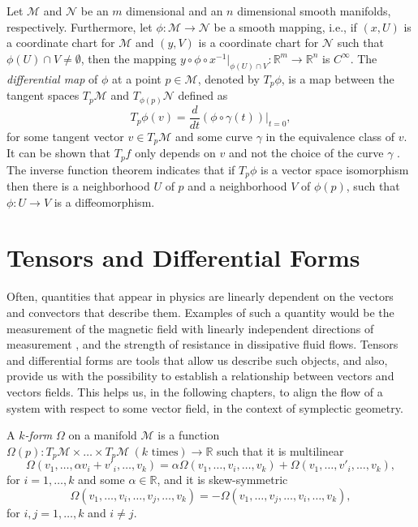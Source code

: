 Let $\mathcal M$ and $\mathcal N$ be an $m$ dimensional and an $n$ dimensional smooth manifolds, respectively. Furthermore, let $\phi:\mathcal M\to \mathcal N$ be a smooth mapping, i.e., if $(x,U)$ is a coordinate chart for $\mathcal M$ and $(y,V)$ is a coordinate chart for $\mathcal N$ such that $\phi(U)\cap V\neq \emptyset$, then the mapping $y\circ \phi \circ x^{-1}|_{\phi(U)\cap V}:\mathbb R^{m}\to \mathbb R^{n}$ is $C^{\infty}$. The \emph{differential map} of $\phi$ at a point $p\in \mathcal M$, denoted by $T_{p}\phi$, is a map between the tangent spaces $T_p \mathcal M$ and $T_{\phi(p)} \mathcal N$ defined as
\begin{equation} \label{eq:2.4}
	T_p \phi(v) = \frac{d}{dt}(\phi\circ \gamma(t))|_{t=0},
\end{equation}
for some tangent vector $v\in T_{p} \mathcal M$ and some curve $\gamma$ in the equivalence class of $v$. It can be shown that $T_p f$ only depends on $v$ and not the choice of the curve $\gamma$ \cite{robbin2011introduction}. The inverse function theorem \cite{rudin1976principles} indicates that if $T_p\phi$ is a vector space isomorphism then there is a neighborhood $U$ of $p$ and a neighborhood $V$ of $\phi(p)$, such that $\phi:U\to V$ is a diffeomorphism.

\section{Tensors and Differential Forms} \label{section:2.2}
Often, quantities that appear in physics are linearly dependent on the vectors and convectors that describe them. Examples of such a quantity would be the measurement of the magnetic field with linearly independent directions of measurement \cite{Wald:106274}, and the strength of resistance in dissipative fluid flows. Tensors and differential forms are tools that allow us describe such objects, and also, provide us with the possibility to establish a relationship between vectors and vectors fields. This helps us, in the following chapters, to align the flow of a system with respect to some vector field, in the context of symplectic geometry. 

\begin{definition}
A \emph{$k$-form} $\Omega$ on a manifold $\mathcal M$ is a function $\Omega(p): T_p\mathcal M \times \dots \times T_p\mathcal M \ (k \text{ times}) \to \mathbb R$ such that it is multilinear
\[
	\Omega(v_1,\dots,\alpha v_i + v'_i, \dots, v_k) = \alpha \Omega(v_1,\dots,v_i, \dots, v_k) + \Omega(v_1,\dots,v'_i, \dots, v_k),
\]
for $i=1,\dots,k$ and some $\alpha \in \mathbb R$, and it is skew-symmetric
\[
	\Omega(v_1,\dots,v_i,\dots,v_j, \dots, v_k) = - \Omega(v_1,\dots,v_j,\dots,v_i, \dots, v_k),
\]
for $i,j=1,\dots,k$ and $i\neq j$.
\end{definition}

